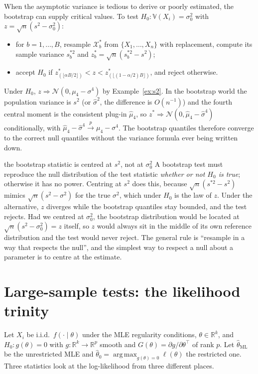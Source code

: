 \documentclass[11pt,a4paper]{article}
\newcommand{\V}{\mathbb{V}}
\newcommand{\R}{\mathbb{R}}
\newcommand{\N}{\mathcal{N}}
\newcommand{\cp}{\xrightarrow{\;p\;}}
\newcommand{\cd}{\Rightarrow}
\newcommand{\iid}{i.i.d.}
\newcommand{\thml}{\hat\theta_{\mathrm{ML}}}
\DeclareMathOperator*{\argmax}{arg\,max}
\begin{document}
When the asymptotic variance is tedious to derive or poorly estimated, the bootstrap can supply critical values. To test $H_0:\V(X_i)=\sigma_0^2$ with $z=\sqrt n(s^2-\sigma_0^2)$:
\begin{itemize}
\item for $b=1,\ldots,B$, resample $\mathcal X^*_b$ from $\{X_1,\ldots,X_n\}$ with replacement, compute its sample variance $s^{*2}_b$ and $z_b^*=\sqrt n(s^{*2}_b-s^2)$;
\item accept $H_0$ if $z^*_{(\lfloor\alpha B/2\rfloor)}<z<z^*_{(\lfloor(1-\alpha/2)B\rfloor)}$, and reject otherwise.
\end{itemize}
Under $H_0$, $z\cd\N(0,\mu_4-\sigma^4)$ by Example~\ref{ex:s2}. In the bootstrap world the population variance is $s^2$ (or $\hat\sigma^2$, the difference is $O(n^{-1})$) and the fourth central moment is the consistent plug-in $\hat\mu_4$, so $z^*\cd\N(0,\hat\mu_4-\hat\sigma^4)$ conditionally, with $\hat\mu_4-\hat\sigma^4\cp\mu_4-\sigma^4$. The bootstrap quantiles therefore converge to the correct null quantiles without the variance formula ever being written down.

\begin{whybox}{the bootstrap statistic is centred at $s^2$, not at $\sigma_0^2$}
A bootstrap test must reproduce the null distribution of the test statistic \emph{whether or not $H_0$ is true}; otherwise it has no power. Centring at $s^2$ does this, because $\sqrt n(s^{*2}-s^2)$ mimics $\sqrt n(s^2-\sigma^2)$ for the true $\sigma^2$, which under $H_0$ is the law of $z$. Under the alternative, $z$ diverges while the bootstrap quantiles stay bounded, and the test rejects. Had we centred at $\sigma_0^2$, the bootstrap distribution would be located at $\sqrt n(s^2-\sigma_0^2)=z$ itself, so $z$ would always sit in the middle of its own reference distribution and the test would never reject. The general rule is ``resample in a way that respects the null'', and the simplest way to respect a null about a parameter is to centre at the estimate.
\end{whybox}

\section{Large-sample tests: the likelihood trinity}\label{sec:trinity}

Let $X_i$ be \iid\ $f(\cdot\mid\theta)$ under the MLE regularity conditions, $\theta\in\R^k$, and $H_0:g(\theta)=0$ with $g:\R^k\to\R^p$ smooth and $G(\theta)=\partial g/\partial\theta^\top$ of rank $p$. Let $\thml$ be the unrestricted MLE and $\hat\theta_0=\argmax_{g(\theta)=0}\ell(\theta)$ the restricted one. Three statistics look at the log-likelihood from three different places.
\end{document}
